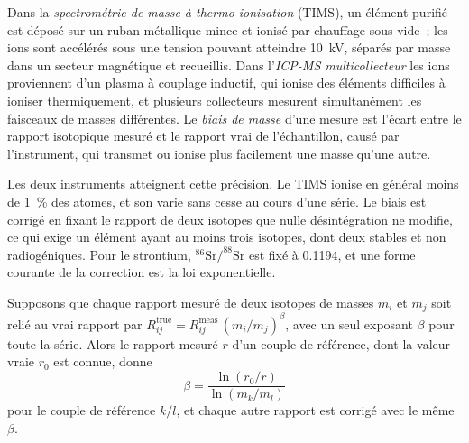 \begin{definition}\label{def:b2:field-lab-methods-2:tims}
Dans la \emph{spectrométrie de masse à thermo-ionisation} (TIMS), un
élément purifié est déposé sur un ruban métallique mince et ionisé par chauffage sous vide~; les ions
sont accélérés sous une tension pouvant atteindre \qty{10}{kV}, séparés par masse dans un secteur magnétique
et recueillis. Dans l'\emph{ICP-MS multicollecteur} les ions proviennent d'un
plasma à couplage inductif, qui ionise des éléments difficiles à ioniser thermiquement, et plusieurs
collecteurs mesurent simultanément les faisceaux de masses différentes. Le \emph{biais
de masse} d'une mesure est l'écart entre le rapport isotopique mesuré et le
rapport vrai de l'échantillon, causé par l'instrument, qui transmet ou ionise plus facilement une masse
qu'une autre.
\end{definition}

Les deux instruments atteignent cette précision. Le TIMS ionise en général moins de
\qty{1}{\percent} des atomes, et son  varie sans cesse au cours d'une série. Le biais est corrigé en fixant le rapport de deux isotopes que nulle
désintégration ne modifie, ce qui exige un élément ayant au moins trois isotopes, dont deux stables et non
radiogéniques. Pour le strontium, $^{86}\mathrm{Sr}/^{88}\mathrm{Sr}$ est fixé à 0.1194, et une forme courante
de la correction est la loi exponentielle.

\begin{proposition}\label{prop:b2:field-lab-methods-2:bias}
Supposons que chaque rapport mesuré de deux isotopes de masses $m_i$ et $m_j$ soit relié au vrai
rapport par $R_{ij}^{\mathrm{true}} = R_{ij}^{\mathrm{meas}}\,(m_i/m_j)^{\beta}$, avec un seul exposant
$\beta$ pour toute la série. Alors le rapport mesuré $r$ d'un couple de référence, dont la valeur vraie
$r_0$ est connue, donne
\begin{equation}
\beta = \frac{\ln(r_0/r)}{\ln(m_k/m_l)}
\label{eq:b2:field-lab-methods-2:beta}
\end{equation}
pour le couple de référence $k/l$, et chaque autre rapport est corrigé avec le même $\beta$.
\end{proposition}

